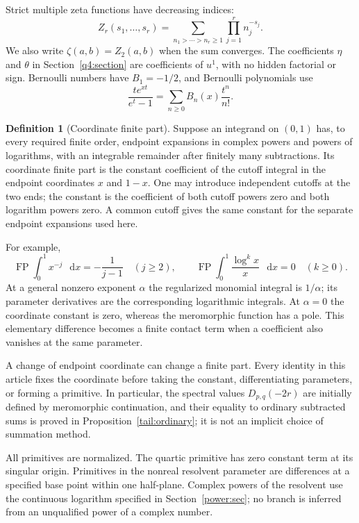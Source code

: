 \documentclass[11pt,a4paper]{article}
\numberwithin{equation}{section}
\theoremstyle{definition}
\newtheorem{definition}[theorem]{Definition}
\theoremstyle{remark}
\DeclareMathOperator{\FP}{FP}
\newcommand{\dd}{\mathop{}\!\mathrm{d}}
\begin{document}
Strict multiple zeta functions have decreasing indices:
\[
Z_r(s_1,\ldots,s_r)=
\sum_{n_1>\cdots>n_r\ge1}\prod_{j=1}^r n_j^{-s_j}.
\]
We also write $\zeta(a,b)=Z_2(a,b)$ when the sum converges.
The coefficients $\eta$ and $\theta$ in Section~\ref{q4:section}
are coefficients of $u^1$, with no hidden factorial or sign.
Bernoulli numbers have $B_1=-1/2$, and Bernoulli polynomials use
\[
\frac{te^{xt}}{e^t-1}=\sum_{n\ge0}B_n(x)\frac{t^n}{n!}.
\]

\begin{definition}[Coordinate finite part]
Suppose an integrand on $(0,1)$ has, to every required finite order,
endpoint expansions in complex powers and powers of logarithms,
with an integrable remainder after finitely many subtractions.
Its coordinate finite part is the constant coefficient of the
cutoff integral in the endpoint coordinates $x$ and $1-x$.
One may introduce independent cutoffs at the two ends; the
constant is the coefficient of both cutoff powers zero and both
logarithm powers zero. A common cutoff gives the same constant
for the separate endpoint expansions used here.
\end{definition}

For example,
\[
\FP\int_0^1x^{-j}\,\dd x=-\frac1{j-1}\quad(j\ge2),
\qquad
\FP\int_0^1\frac{\log^k x}{x}\,\dd x=0\quad(k\ge0).
\]
At a general nonzero exponent $\alpha$ the regularized monomial
integral is $1/\alpha$; its parameter derivatives are the
corresponding logarithmic integrals. At $\alpha=0$ the coordinate
constant is zero, whereas the meromorphic function has a pole.
This elementary difference becomes a finite contact term when a
coefficient also vanishes at the same parameter.

A change of endpoint coordinate can change a finite part. Every
identity in this article fixes the coordinate before taking the
constant, differentiating parameters, or forming a primitive.
In particular, the spectral values $D_{p,q}(-2r)$ are initially
defined by meromorphic continuation, and their equality to
ordinary subtracted sums is proved in
Proposition~\ref{tail:ordinary}; it is not an implicit choice
of summation method.

All primitives are normalized. The quartic primitive has zero
constant term at its singular origin. Primitives in the nonreal
resolvent parameter are differences at a specified base point
within one half-plane. Complex powers of the resolvent use the
continuous logarithm specified in
Section~\ref{power:sec}; no branch is inferred from an
unqualified power of a complex number.
\end{document}
